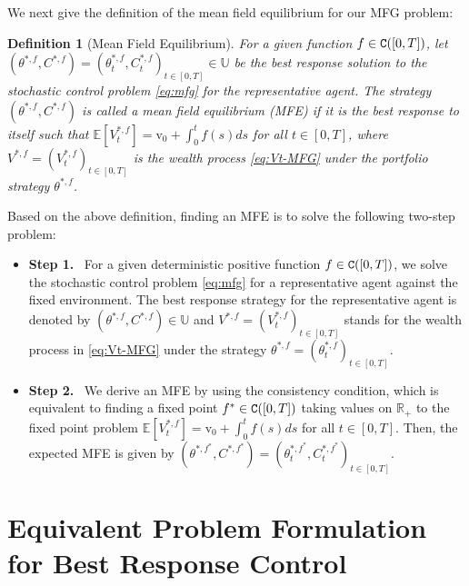 \documentclass[11pt,times,letter]{article}
\newcommand{\Ex}{ \mathbb{E} }
\newcommand{\R}{\mathds{R}}
\newcommand{\C}{{\tt{C}}}
\newtheorem{definition}{Definition}[section]
\numberwithin{equation}{section}
\begin{document}
We next give the definition of the mean field equilibrium for our MFG problem:
\begin{definition}[Mean Field Equilibrium]\label{def:MFG}
For a given function $f\in\C([0,T])$, let $(\theta^{*,f},C^{*,f})=(\theta_t^{*,f},C_t^{*,f})_{t\in[0,T]}\in \mathbb{U}$ be the best response solution to the stochastic control problem \eqref{eq:mfg} for the representative agent. The strategy $(\theta^{*,f},C^{*,f})$ is called a mean field equilibrium (MFE) if it is the best response to itself such that $\Ex[V_t^{*,f}]=\mathrm{v}_0+\int_0^t f(s)ds$ for all $t\in[0,T]$, where $V^{*,f}=(V_t^{*,f})_{t\in[0,T]}$ is the wealth process \eqref{eq:Vt-MFG} under the portfolio strategy $\theta^{*,f}$. 
\end{definition}
Based on the above definition, finding an MFE is to solve the following two-step problem:
\begin{itemize} 
\item {\bf Step 1.}~ For a given deterministic positive function $f\in\C([0,T])$, we solve the stochastic control problem \eqref{eq:mfg} for a representative agent against the fixed environment.
The best response strategy for the representative agent is denoted by $(\theta^{*,f},C^{*,f})\in \mathbb{U}$ and $V^{*,f}=(V_t^{*,f})_{t\in[0,T]}$ stands for the wealth process in \eqref{eq:Vt-MFG} under the strategy $\theta^{*,f}=(\theta_t^{*,f})_{t\in[0,T]}$.
\item{\bf Step 2.}~ We derive an MFE by using the consistency condition, which is equivalent to finding a fixed point $f^*\in\C([0,T])$ taking values on $\R_+$ to the fixed point problem $\Ex[V_t^{*,f}]=\mathrm{v}_0+\int_0^t f(s)ds$ for all $t\in[0,T]$. Then, the expected MFE is given by $(\theta^{*,f^*},C^{*,f^*})=(\theta_t^{*,f^*},C_t^{*,f^*})_{t\in[0,T]}$.
\end{itemize}



\section{Equivalent Problem Formulation for Best Response Control}\label{sec:auxiliary}
\end{document}
